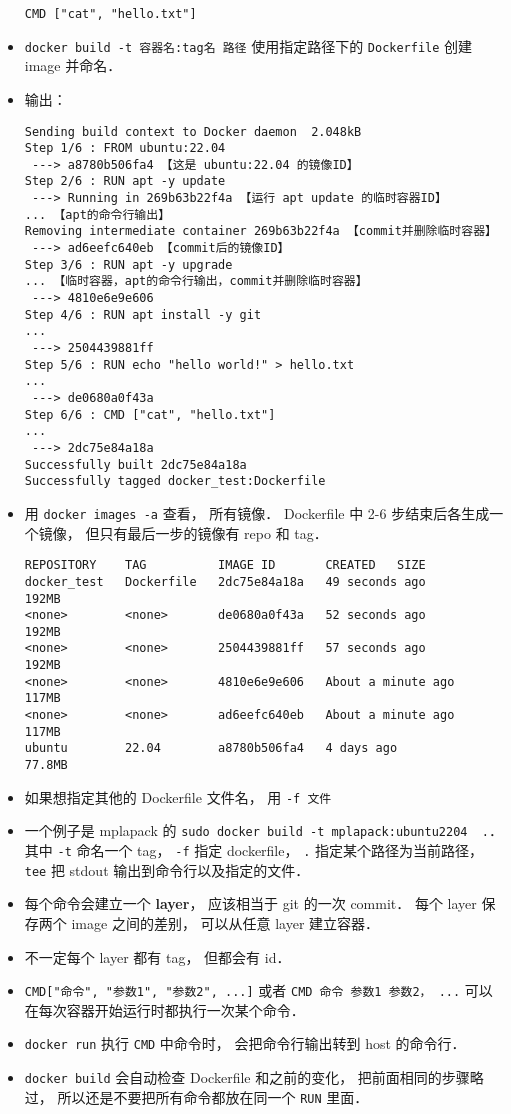 \begin{itemize}
\begin{lstlisting}[language=none]
CMD ["cat", "hello.txt"]
\end{lstlisting}
\item \verb|docker build -t 容器名:tag名 路径| 使用指定路径下的 \verb|Dockerfile| 创建 image 并命名．
\item 输出：
\begin{lstlisting}[language=none]
Sending build context to Docker daemon  2.048kB
Step 1/6 : FROM ubuntu:22.04
 ---> a8780b506fa4 【这是 ubuntu:22.04 的镜像ID】
Step 2/6 : RUN apt -y update
 ---> Running in 269b63b22f4a 【运行 apt update 的临时容器ID】
... 【apt的命令行输出】
Removing intermediate container 269b63b22f4a 【commit并删除临时容器】
 ---> ad6eefc640eb 【commit后的镜像ID】
Step 3/6 : RUN apt -y upgrade
... 【临时容器，apt的命令行输出，commit并删除临时容器】
 ---> 4810e6e9e606
Step 4/6 : RUN apt install -y git
...
 ---> 2504439881ff
Step 5/6 : RUN echo "hello world!" > hello.txt
...
 ---> de0680a0f43a
Step 6/6 : CMD ["cat", "hello.txt"]
...
 ---> 2dc75e84a18a
Successfully built 2dc75e84a18a
Successfully tagged docker_test:Dockerfile
\end{lstlisting}
\item 用 \verb|docker images -a| 查看， 所有镜像． Dockerfile 中 2-6 步结束后各生成一个镜像， 但只有最后一步的镜像有 repo 和 tag．
\begin{lstlisting}[language=none]
REPOSITORY    TAG          IMAGE ID       CREATED   SIZE
docker_test   Dockerfile   2dc75e84a18a   49 seconds ago       192MB
<none>        <none>       de0680a0f43a   52 seconds ago       192MB
<none>        <none>       2504439881ff   57 seconds ago       192MB
<none>        <none>       4810e6e9e606   About a minute ago   117MB
<none>        <none>       ad6eefc640eb   About a minute ago   117MB
ubuntu        22.04        a8780b506fa4   4 days ago           77.8MB
\end{lstlisting}
\item 如果想指定其他的 Dockerfile 文件名， 用 \verb|-f 文件|
\item 一个例子是 mplapack 的 \verb|sudo docker build -t mplapack:ubuntu2204  .|． 其中 \verb|-t| 命名一个 tag， \verb|-f| 指定 dockerfile， \verb|.| 指定某个路径为当前路径， \verb|tee| 把 stdout 输出到命令行以及指定的文件．
\item 每个命令会建立一个 \textbf{layer}， 应该相当于 git 的一次 commit． 每个 layer 保存两个 image 之间的差别， 可以从任意 layer 建立容器．
\item 不一定每个 layer 都有 tag， 但都会有 id．
\item \verb|CMD["命令", "参数1", "参数2", ...]| 或者 \verb|CMD 命令 参数1 参数2， ...| 可以在每次容器开始运行时都执行一次某个命令．
\item \verb|docker run| 执行 \verb|CMD| 中命令时， 会把命令行输出转到 host 的命令行．
\item \verb|docker build| 会自动检查 Dockerfile 和之前的变化， 把前面相同的步骤略过， 所以还是不要把所有命令都放在同一个 \verb|RUN| 里面．
\end{itemize}

